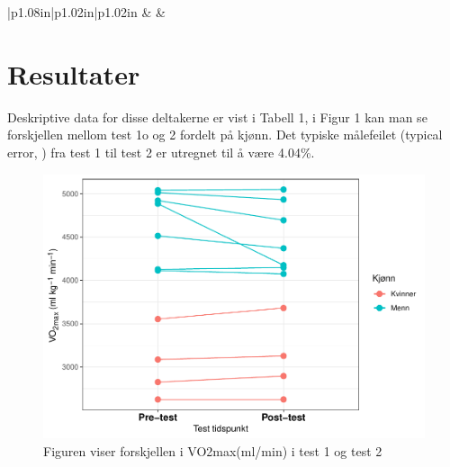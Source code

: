 \documentclass[
]{book}
\begin{document}
\begin{longtable}[c]{|p{1.08in}|p{1.02in}|p{1.02in}}
 &  &  \\




\end{longtable}

\hypertarget{resultater}{%
\section{Resultater}\label{resultater}}

Deskriptive data for disse deltakerne er vist i Tabell 1, i Figur 1 kan man se forskjellen mellom test 1o og 2 fordelt på kjønn. Det typiske målefeilet (typical error, \citep{hopkins2000}) fra test 1 til test 2 er utregnet til å være 4.04\%.

\begin{figure}
\centering
\includegraphics{_main_files/figure-latex/Figur-1.pdf}
\caption{\label{fig:Figur}Figuren viser forskjellen i VO2max(ml/min) i test 1 og test 2}
\end{figure}
\end{document}
